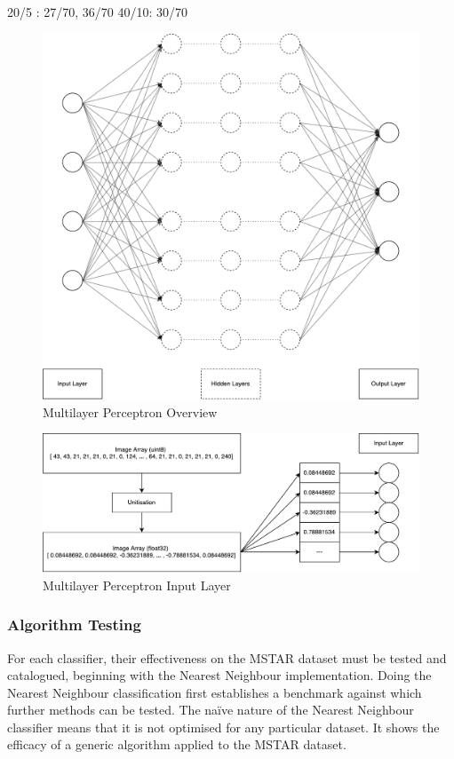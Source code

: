  20/5 : 27/70, 36/70
 40/10: 30/70

\begin{figure}[!h]
	
	\centering
	\includegraphics[width=\textwidth]{figures/multilayer_perceptron}
	\centering
	\caption{Multilayer Perceptron Overview}
	\label{fig:multi}
\end{figure}


\begin{figure}[!h]
	
	\centering
	\includegraphics[width=\textwidth]{figures/multilayer_perceptron_input}
	\centering
	\caption{Multilayer Perceptron Input Layer}
	\label{fig:multi_input}
\end{figure}


\subsubsection{Algorithm Testing}
For each classifier, their effectiveness on the MSTAR dataset must be tested and catalogued, beginning with the Nearest Neighbour implementation. Doing the Nearest Neighbour classification first establishes a benchmark against which further methods can be tested. The na{\"i}ve nature of the Nearest Neighbour classifier means that it is not optimised for any particular dataset. It shows the efficacy of a generic algorithm applied to the MSTAR dataset.

